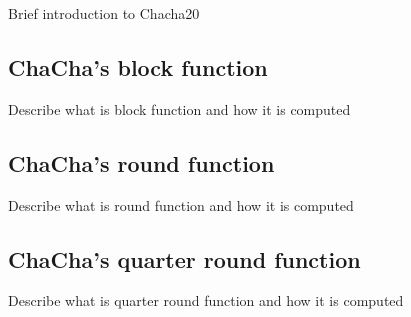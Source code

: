 Brief introduction to Chacha20
\subsection{ChaCha's block function}
Describe what is block function and how it is computed

\subsection{ChaCha's round function}
Describe what is round function and how it is computed

\subsection{ChaCha's quarter round function}
Describe what is quarter round function and how it is computed
